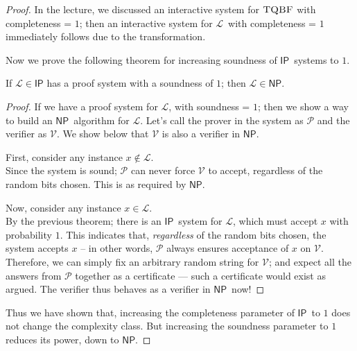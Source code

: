 \documentclass[usletter]{article}
\newcommand {\langset}[1]      {\ensuremath{\mathcal{#1}}}
\newcommand {\machine}[1]      {\ensuremath{\mathscr{#1}}}
\newcommand {\namedlangset}[1] {\ensuremath{\textnormal{\textsc{#1}}}}
\newcommand {\family}[1]       {\ensuremath{\mathsf{#1}}}
\newcommand {\langL}          {\langset{L}}
\newcommand {\IP}     {\family{IP}}
\newcommand {\NP}     {\family{NP}}
\begin{document}
\begin{enumerate}[labelsep=2.5em, label=\textbf{\arabic{enumi}}]
\begin{proof}
    In the lecture, we discussed an interactive system for \namedlangset{TQBF}
    with completeness = $1$; then an interactive system for \langL\ with
    completeness = $1$ immediately follows due to the transformation.

    Now we prove the following theorem for increasing soundness of \IP\ systems
    to $1$.
    \begin{theorem}
      If $\langL \in \IP$ has a proof system with a soundness of $1$; then
      $\langL \in \NP$.
    \end{theorem}
    \begin{proof}
      If we have a proof system for \langL, with soundness = $1$; then we show a
      way to build an \NP\ algorithm for \langL. Let's call the prover in the
      system as \machine{P} and the verifier as \machine{V}. We show below that
      \machine{V} is also a verifier in \NP.

      First, consider any instance $x \not\in \langL$. \\
      Since the system is sound; \machine{P} can never force \machine{V} to
      accept, regardless of the random bits chosen. This is as required by \NP.

      Now, consider any instance $x \in \langL$. \\
      By the previous theorem; there is an \IP\ system for \langL, which must
      accept $x$ with probability $1$. This indicates that, \textit{regardless}
      of the random bits chosen, the system accepts $x$ -- in other words,
      \machine{P} always ensures acceptance of $x$ on \machine{V}. \\
      Therefore, we can simply fix an arbitrary random string for \machine{V};
      and expect all the answers from \machine{P} together as a certificate ---
      such a certificate would exist as argued. The verifier thus behaves as a
      verifier in \NP\ now!
    \end{proof}

    Thus we have shown that, increasing the completeness parameter of \IP\ to
    $1$ does not change the complexity class. But increasing the soundness
    parameter to $1$ reduces its power, down to \NP.
  \end{proof}


\end{enumerate}
\end{document}
